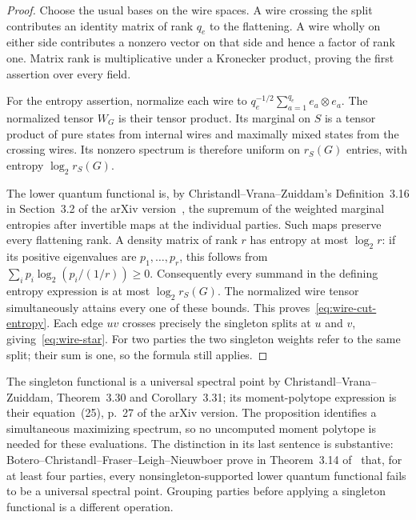 \begin{proof}
Choose the usual bases on the wire spaces.  A wire crossing the split contributes an identity matrix of rank $q_e$ to the flattening.  A wire wholly on either side contributes a nonzero vector on that side and hence a factor of rank one.  Matrix rank is multiplicative under a Kronecker product, proving the first assertion over every field.

For the entropy assertion, normalize each wire to
$q_e^{-1/2}\sum_{a=1}^{q_e}e_a\otimes e_a$.  The normalized tensor $W_G$ is their tensor product.  Its marginal on $S$ is a tensor product of pure states from internal wires and maximally mixed states from the crossing wires.  Its nonzero spectrum is therefore uniform on $r_S(G)$ entries, with entropy $\log_2 r_S(G)$.

The lower quantum functional is, by Christandl--Vrana--Zuiddam's Definition~3.16 in Section~3.2 of the arXiv version~\cite{cvz-universal}, the supremum of the weighted marginal entropies after invertible maps at the individual parties.  Such maps preserve every flattening rank.  A density matrix of rank $r$ has entropy at most $\log_2 r$: if its positive eigenvalues are $p_1,\ldots,p_r$, this follows from
$\sum_i p_i\log_2(p_i/(1/r))\geq0$.
Consequently every summand in the defining entropy expression is at most $\log_2 r_S(G)$.  The normalized wire tensor simultaneously attains every one of these bounds.  This proves~\eqref{eq:wire-cut-entropy}.  Each edge $uv$ crosses precisely the singleton splits at $u$ and $v$, giving~\eqref{eq:wire-star}.  For two parties the two singleton weights refer to the same split; their sum is one, so the formula still applies.
\end{proof}

The singleton functional is a universal spectral point by Christandl--Vrana--Zuiddam, Theorem~3.30 and Corollary~3.31; its moment-polytope expression is their equation~(25), p.~27 of the arXiv version.  The proposition identifies a simultaneous maximizing spectrum, so no uncomputed moment polytope is needed for these evaluations.  The distinction in its last sentence is substantive: Botero--Christandl--Fraser--Leigh--Nieuwboer prove in Theorem~3.14 of~\cite{bcfln-quantum} that, for at least four parties, every nonsingleton-supported lower quantum functional fails to be a universal spectral point.  Grouping parties before applying a singleton functional is a different operation.

